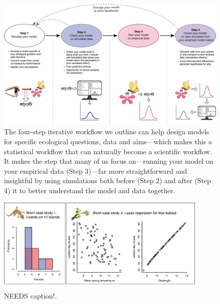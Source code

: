 \documentclass[11pt]{article}
\begin{document}
\newpage

\begin{figure}[ht]
\centering
\noindent \includegraphics[width=1\textwidth]{figures/workflow.png}
\caption{The four-step iterative workflow we outline can help design models for specific ecological questions, data and aims---which makes this a statistical workflow that can naturally become a scientific workflow. It makes the step that many of us focus on---running your model on your empirical data (Step 3)---far more straightforward and insightful by using simulations both before (Step 2) and after (Step 4) it to better understand the model and data together.}
\label{fig:workflow}
\end{figure}

\begin{figure}[ht]
\centering
\noindent \includegraphics[width=0.9\textwidth]{figures/twoexamples.png}
\caption{NEEDS caption!.}
\label{fig:twoexamples}
\end{figure}
\end{document}
